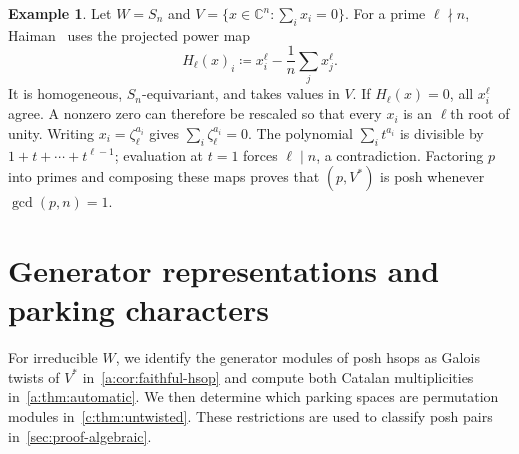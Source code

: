 \documentclass[11pt]{amsart}
\newcommand{\defeq}{\coloneqq}
\theoremstyle{definition}
\newtheorem{example}[theorem]{Example}
\newcommand{\C}{\mathbb C}\newcommand{\Q}{\mathbb Q}
\begin{document}
\begin{example}\label{c:ex:haiman}
Let $W=S_n$ and $V=\{x\in\C^n:\sum_i x_i=0\}$.
For a prime $\ell\nmid n$, Haiman~\cite[Proposition~2.5.4]{Haiman}
uses the projected power map
\begin{equation}\label{c:eq:haiman-projection}
 H_\ell(x)_i\defeq x_i^\ell-\frac1n\sum_jx_j^\ell.
\end{equation}
It is homogeneous, $S_n$-equivariant, and takes values in $V$.
If $H_\ell(x)=0$, all $x_i^\ell$ agree. A nonzero zero can therefore
be rescaled so that every $x_i$ is an $\ell$th root of unity.
Writing $x_i=\zeta_\ell^{a_i}$ gives
$\sum_i\zeta_\ell^{a_i}=0$. The polynomial
$\sum_i t^{a_i}$ is divisible by $1+t+\cdots+t^{\ell-1}$;
evaluation at $t=1$ forces $\ell\mid n$, a contradiction.
Factoring $p$ into primes and composing these maps proves that
$(p,V^*)$ is posh whenever $\gcd(p,n)=1$.
\end{example}

\section{Generator representations and parking characters}\label{sec:generators}

For irreducible $W$, we identify the generator modules of posh hsops
as Galois twists of $V^*$ in~\cref{a:cor:faithful-hsop} and compute
both Catalan multiplicities in~\cref{a:thm:automatic}.
We then determine which parking spaces are permutation modules
in~\cref{c:thm:untwisted}. These restrictions are used to classify
posh pairs in~\cref{sec:proof-algebraic}.
\end{document}
